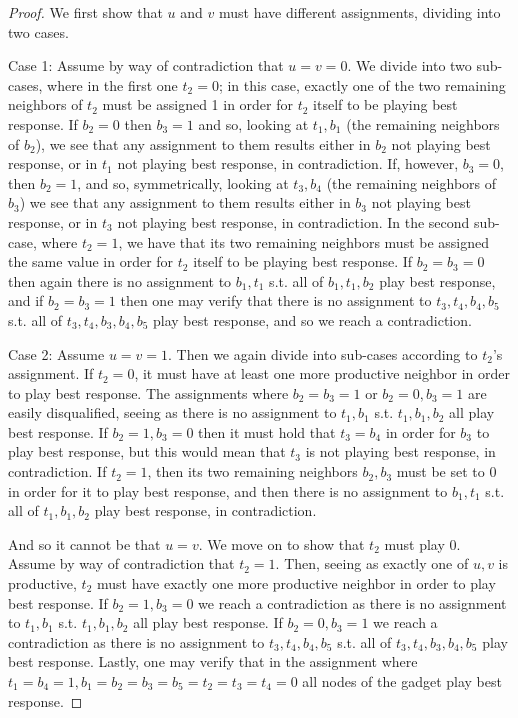 \documentclass[runningheads]{llncs}
\begin{document}
\begin{proof}
We first show that $u$ and $v$ must have different assignments, dividing into two cases. 

Case 1: Assume by way of contradiction that $u=v=0$. We divide into two sub-cases, where in the first one $t_2=0$; in this case, exactly one of the two remaining neighbors of $t_2$ must be assigned 1 in order for $t_2$ itself to be playing best response. If $b_2=0$ then $b_3=1$ and so, looking at $t_1,b_1$ (the remaining neighbors of $b_2$), we see that any assignment to them results either in $b_2$ not playing best response, or in $t_1$ not playing best response, in contradiction. If, however, $b_3=0$, then $b_2=1$, and so, symmetrically, looking at $t_3,b_4$ (the remaining neighbors of $b_3$) we see that any assignment to them results either in $b_3$ not playing best response, or in $t_3$ not playing best response, in contradiction.
In the second sub-case, where $t_2=1$, we have that its two remaining neighbors must be assigned the same value in order for $t_2$ itself to be playing best response. If $b_2=b_3=0$ then again there is no assignment to $b_1,t_1$ s.t. all of $b_1,t_1,b_2$ play best response, and if $b_2=b_3=1$ then one may verify that there is no assignment to $t_3,t_4,b_4,b_5$ s.t. all of $t_3,t_4,b_3,b_4,b_5$ play best response, and so we reach a contradiction.

Case 2: Assume $u=v=1$. Then we again divide into sub-cases according to $t_2$'s assignment. If $t_2=0$, it must have at least one more productive neighbor in order to play best response. The assignments where $b_2=b_3=1$ or $b_2=0,b_3=1$ are easily disqualified, seeing as there is no assignment to $t_1,b_1$ s.t. $t_1,b_1,b_2$ all play best response. If $b_2=1,b_3=0$ then it must hold that $t_3=b_4$ in order for $b_3$ to play best response, but this would mean that $t_3$ is not playing best response, in contradiction.
If $t_2=1$, then its two remaining neighbors $b_2,b_3$ must be set to 0 in order for it to play best response, and then there is no assignment to $b_1,t_1$ s.t. all of $t_1,b_1,b_2$ play best response, in contradiction.

And so it cannot be that $u=v$. We move on to show that $t_2$ must play 0. Assume by way of contradiction that $t_2=1$. Then, seeing as exactly one of $u,v$ is productive, $t_2$ must have exactly one more productive neighbor in order to play best response. If $b_2=1,b_3=0$ we reach a contradiction as there is no assignment to $t_1,b_1$ s.t. $t_1,b_1,b_2$ all play best response. If $b_2=0,b_3=1$ we reach a contradiction as there is no assignment to $t_3,t_4,b_4,b_5$ s.t. all of $t_3,t_4,b_3,b_4,b_5$ play best response.
Lastly, one may verify that in the assignment where $t_1=b_4=1, b_1=b_2=b_3=b_5=t_2=t_3=t_4=0$ all nodes of the gadget play best response.
\end{proof}
\end{document}
